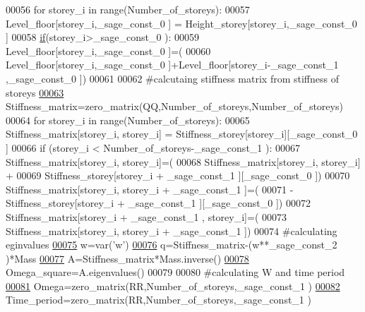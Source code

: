 \begin{DoxyCode}
00056 \textcolor{keywordflow}{for} storey\_i \textcolor{keywordflow}{in} range(Number\_of\_storeys):
00057     Level\_floor[storey\_i,\_sage\_const\_0 ] = Height\_storey[storey\_i,\_sage\_const\_0 ]
00058     \hyperlink{bootstrap_8min_8js_ac2d69f5011896c6ed4a54e0dd36f6334}{if}(storey\_i>\_sage\_const\_0 ):
00059         Level\_floor[storey\_i,\_sage\_const\_0 ]=(
00060         Level\_floor[storey\_i,\_sage\_const\_0 ]+Level\_floor[storey\_i-\_sage\_const\_1 ,\_sage\_const\_0 ])
00061 
00062 \textcolor{comment}{#calcutaing stiffness matrix from stiffness of storeys}
\hypertarget{main_8sage_8py_source_l00063}{}\hyperlink{namespacemain_a0011be18dbc87087d6aaf28802f121c0}{00063} Stiffness\_matrix=zero\_matrix(QQ,Number\_of\_storeys,Number\_of\_storeys)
00064 \textcolor{keywordflow}{for} storey\_i \textcolor{keywordflow}{in} range(Number\_of\_storeys):
00065     Stiffness\_matrix[storey\_i, storey\_i] = Stiffness\_storey[storey\_i][\_sage\_const\_0 ]
00066     \textcolor{keywordflow}{if} (storey\_i < Number\_of\_storeys-\_sage\_const\_1 ):
00067         Stiffness\_matrix[storey\_i, storey\_i]=(
00068             Stiffness\_matrix[storey\_i, storey\_i] +
00069             Stiffness\_storey[storey\_i + \_sage\_const\_1 ][\_sage\_const\_0 ])
00070         Stiffness\_matrix[storey\_i, storey\_i + \_sage\_const\_1 ]=(
00071         -Stiffness\_storey[storey\_i + \_sage\_const\_1 ][\_sage\_const\_0 ])
00072         Stiffness\_matrix[storey\_i + \_sage\_const\_1 , storey\_i]=(
00073         Stiffness\_matrix[storey\_i, storey\_i + \_sage\_const\_1 ])
00074 \textcolor{comment}{#calculating eginvalues}
\hypertarget{main_8sage_8py_source_l00075}{}\hyperlink{namespacemain_af76005101c339a32cd5d37ba82ee072c}{00075} w=var(\textcolor{stringliteral}{'w'})
\hypertarget{main_8sage_8py_source_l00076}{}\hyperlink{namespacemain_a1787a37505189f764069a45071189112}{00076} q=Stiffness\_matrix-(w**\_sage\_const\_2 )*Mass
\hypertarget{main_8sage_8py_source_l00077}{}\hyperlink{namespacemain_ad101f166a53497f04b37636bcadbfe65}{00077} A=Stiffness\_matrix*Mass.inverse()
\hypertarget{main_8sage_8py_source_l00078}{}\hyperlink{namespacemain_a63066086ca439ff34de16475b00387f5}{00078} Omega\_square=A.eigenvalues()
00079 
00080 \textcolor{comment}{#calculating W and time period}
\hypertarget{main_8sage_8py_source_l00081}{}\hyperlink{namespacemain_af44dcb60e61649c65257466d65b4d548}{00081} Omega=zero\_matrix(RR,Number\_of\_storeys,\_sage\_const\_1 )
\hypertarget{main_8sage_8py_source_l00082}{}\hyperlink{namespacemain_a6bf4b8266bcb3b4f390149620fea3d6c}{00082} Time\_period=zero\_matrix(RR,Number\_of\_storeys,\_sage\_const\_1 )

\end{DoxyCode}
